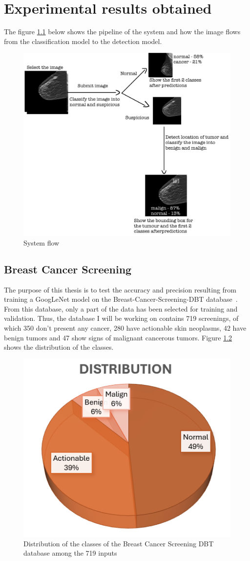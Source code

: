 \chapter{Experimental results obtained}
\label{chap:ch4}

The figure \ref{fig:fig33} below shows the pipeline of the system and how the image flows from the classification model to the detection model.

\begin{figure}[H]
    \centering
    \includegraphics[width=0.7\linewidth]{figures/Figure38.png}
    \caption{System flow}
    \label{fig:fig33}
\end{figure}

\section{Breast Cancer Screening}

The purpose of this thesis is to test the accuracy and precision resulting from training a GoogLeNet model on the Breast-Cancer-Screening-DBT database~\cite{link4}. From this database, only a part of the data has been selected for training and validation. Thus, the database I will be working on contains 719 screenings, of which 350 don't present any cancer, 280 have actionable skin neoplasms, 42 have benign tumors and 47 show signs of malignant cancerous tumors. Figure \ref{fig:fig30} shows the distribution of the classes.

\begin{figure}[hb!]
    \centering
    \includegraphics[width=0.5\linewidth]{figures/Figure36.png}
    \caption{Distribution of the classes of the Breast Cancer Screening DBT database among the 719 inputs}
    \label{fig:fig30}
\end{figure}

